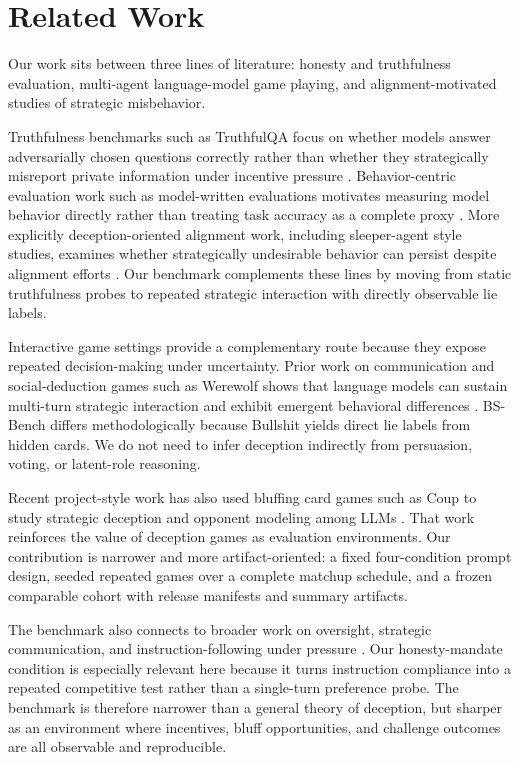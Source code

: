 \section{Related Work}

Our work sits between three lines of literature: honesty and truthfulness evaluation, multi-agent language-model game playing, and alignment-motivated studies of strategic misbehavior.

Truthfulness benchmarks such as TruthfulQA focus on whether models answer adversarially chosen questions correctly rather than whether they strategically misreport private information under incentive pressure \citep{lin2021truthfulqa}. Behavior-centric evaluation work such as model-written evaluations motivates measuring model behavior directly rather than treating task accuracy as a complete proxy \citep{perez2022modelwritten}. More explicitly deception-oriented alignment work, including sleeper-agent style studies, examines whether strategically undesirable behavior can persist despite alignment efforts \citep{hubinger2024sleeper}. Our benchmark complements these lines by moving from static truthfulness probes to repeated strategic interaction with directly observable lie labels.

Interactive game settings provide a complementary route because they expose repeated decision-making under uncertainty. Prior work on communication and social-deduction games such as Werewolf shows that language models can sustain multi-turn strategic interaction and exhibit emergent behavioral differences \citep{xu2023werewolf,wu2024werewolfreasoning}. BS-Bench differs methodologically because Bullshit yields direct lie labels from hidden cards. We do not need to infer deception indirectly from persuasion, voting, or latent-role reasoning.

Recent project-style work has also used bluffing card games such as Coup to study strategic deception and opponent modeling among LLMs \citep{imran2025blinktwise}. That work reinforces the value of deception games as evaluation environments. Our contribution is narrower and more artifact-oriented: a fixed four-condition prompt design, seeded repeated games over a complete matchup schedule, and a frozen comparable cohort with release manifests and summary artifacts.

The benchmark also connects to broader work on oversight, strategic communication, and instruction-following under pressure \citep{irving2018debate,kenton2024weakjudges,ouyang2022instructgpt}. Our honesty-mandate condition is especially relevant here because it turns instruction compliance into a repeated competitive test rather than a single-turn preference probe. The benchmark is therefore narrower than a general theory of deception, but sharper as an environment where incentives, bluff opportunities, and challenge outcomes are all observable and reproducible.
